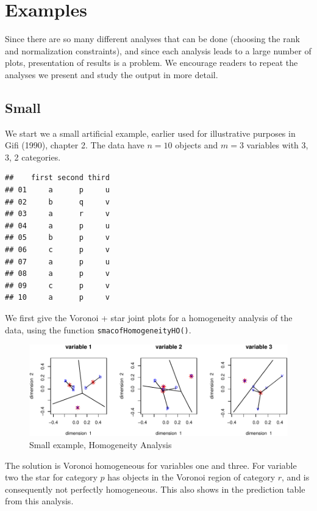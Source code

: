 \documentclass[
  12pt,
]{article}
\begin{document}
\section{Examples}\label{examples}

Since there are so many different analyses that can be done (choosing
the rank and normalization constraints), and since each analysis leads
to a large number of plots, presentation of results is a problem. We encourage readers to repeat the analyses we present and study the output
in more detail.

\subsection{Small}\label{small}

We start we a small artificial example, earlier used for illustrative purposes in Gifi (1990), chapter 2. The data have \(n=10\) objects and
\(m=3\) variables with 3, 3, 2 categories.

\begin{verbatim}
##    first second third
## 01     a      p     u
## 02     b      q     v
## 03     a      r     v
## 04     a      p     u
## 05     b      p     v
## 06     c      p     v
## 07     a      p     u
## 08     a      p     v
## 09     c      p     v
## 10     a      p     v
\end{verbatim}

We first give the Voronoi + star joint plots for a homogeneity
analysis of the data, using the function \texttt{smacofHomogeneityHO()}.

\begin{figure}

{\centering \includegraphics{smacofHO_files/figure-latex/smallhomals-1} 

}

\caption{Small example, Homogeneity Analysis}\label{fig:smallhomals}
\end{figure}

The solution is Voronoi homogeneous for variables one and three. For
variable two the star for category \(p\) has objects in the Voronoi
region of category \(r\), and is consequently not perfectly homogeneous.
This also shows in the prediction table from this analysis.
\end{document}
